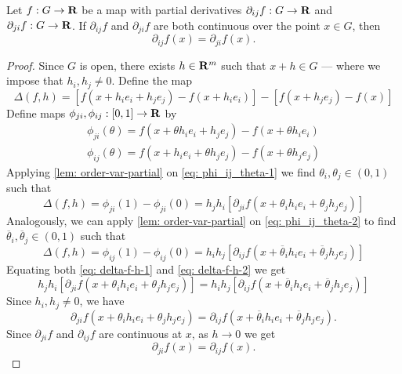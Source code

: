 \begin{theorem}
    \label{thm: order-var-partial}
    Let \(f: G \to \mathbf{R}\) be a map with partial derivatives \(\partial_{i j} f: G
    \to \mathbf{R}\) and \(\partial_{j i} f: G \to \mathbf{R}\). If \(\partial_{i j} f\) and
    \(\partial_{j i} f\) are both continuous over the point \(x \in G\), then
    \[
        \partial_{i j} f(x) = \partial_{j i} f(x).
    \]
\end{theorem}

\begin{proof}
    Since \(G\) is open, there exists \(h \in \mathbf{R}^m\) such that \(x + h \in G\) ---
    where we impose that \(h_i, h_j \neq 0\). Define the map
    \begin{equation}\label{eq: order-var-partial-1}
        \Delta(f, h) =
        [f(x + h_i e_i + h_j e_j) - f(x + h_i e_i)] - [f(x + h_j e_j) - f(x)]
    \end{equation}
    Define maps \(\phi_{ji}, \phi_{ij}: [0, 1] \to \mathbf{R}\) by
    \begin{gather}
        \label{eq: phi_ij_theta-1}
        \phi_{ji}(\theta) = f(x + \theta h_i e_i + h_j e_j) - f(x + \theta h_i e_i)
        \\
        \label{eq: phi_ij_theta-2}
        \phi_{ij}(\theta) = f(x + h_i e_i + \theta h_j e_j) - f(x + \theta h_j e_j)
    \end{gather}
    Applying \cref{lem: order-var-partial} on \cref{eq: phi_ij_theta-1} we find
    \(\theta_i, \theta_j \in (0, 1)\) such that
    \begin{equation}\label{eq: delta-f-h-1}
        \Delta(f, h) = \phi_{ji}(1) - \phi_{ji}(0)
        = h_j h_i [\partial_{ji} f(x + \theta_i h_i e_i + \theta_j h_j e_j)]
    \end{equation}
    Analogously, we can apply \cref{lem: order-var-partial} on \cref{eq:
        phi_ij_theta-2} to find \(\overline \theta_i, \overline \theta_j \in (0, 1)\)
    such that
    \begin{equation}\label{eq: delta-f-h-2}
        \Delta(f, h) = \phi_{ij}(1) - \phi_{ij}(0)
        = h_i h_j [\partial_{ij} f(x + \overline \theta_i h_i e_i + \overline
        \theta_j h_j e_j)]
    \end{equation}
    Equating both \cref{eq: delta-f-h-1} and \cref{eq: delta-f-h-2} we get
    \[
        h_j h_i [\partial_{ji} f(x + \theta_i h_i e_i + \theta_j h_j e_j)]
        = h_i h_j [\partial_{ij} f(x + \overline \theta_i h_i e_i + \overline
        \theta_j h_j e_j)]
    \]
    Since \(h_i, h_j \neq 0\), we have
    \[
        \partial_{ji} f(x + \theta_i h_i e_i + \theta_j h_j e_j)
        = \partial_{ij} f(x + \overline \theta_i h_i e_i + \overline \theta_j h_j
        e_j).
    \]
    Since \(\partial_{ji} f\) and \(\partial_{ij} f\) are continuous at \(x\), as
    \(h \to 0\) we get
    \[
        \partial_{ji} f(x) = \partial_{ij} f(x).
    \]
\end{proof}

